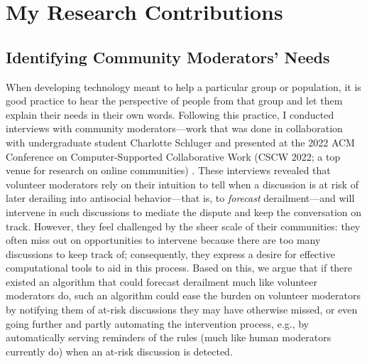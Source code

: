 \documentclass[11pt,letterpaper]{article}
\begin{document}
\section{My Research Contributions}

\subsection{Identifying Community Moderators' Needs}
When developing technology meant to help a particular group or population, it is good practice to hear the perspective of people from that group and let them explain their needs in their own words.
Following this practice, I conducted interviews with community moderators---work that was done in collaboration with undergraduate student Charlotte Schluger and presented at the 2022 ACM Conference on Computer-Supported Collaborative Work (CSCW 2022; a top venue for research on online communities) \cite{schluger_proactive_2022}.
These interviews revealed that volunteer moderators rely on their intuition to tell when a discussion is at risk of later derailing into antisocial behavior---that is, to \emph{forecast} derailment---and will intervene in such discussions to mediate the dispute and keep the conversation on track.
However, they feel challenged by the sheer scale of their communities: they often miss out on opportunities to intervene because there are too many discussions to keep track of; consequently, they express a desire for effective computational tools to aid in this process.
Based on this, we argue that if there existed an algorithm that could forecast derailment much like volunteer moderators do, such an algorithm could ease the burden on volunteer moderators by notifying them of at-risk discussions they may have otherwise missed, or even going further and partly automating the intervention process, e.g., by automatically serving reminders of the rules (much like human moderators currently do) when an at-risk discussion is detected.
\end{document}
